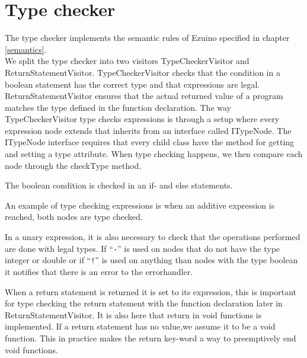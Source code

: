 \section{Type checker}
The type checker implements the semantic rules of Ezuino specified in chapter \ref{semantics}. \\
We split the type checker into two visitors TypeCheckerVisitor and ReturnStatementVisitor. TypeCheckerVisitor checks that the condition in a boolean statement has the correct type and that expressions are legal. ReturnStatementVisitor ensures that the actual returned value of a program matches the type defined in the function declaration.
The way TypeCheckerVisitor type checks expressions is through a setup where every expression node extends that inherits from an interface called ITypeNode. The ITypeNode interface requires that every child class have the method for getting and setting a type attribute. When type checking happens, we then compare each node through the checkType method.

\noindent\newline

The boolean condition is checked in an if- and else statements.

\noindent\newline

An example of type checking expressions is when an additive expression is reached, both nodes are type checked.

\noindent\newline

In a unary expression, it is also necessary to check that the operations performed are done with legal types. If “\texttt{-}” is used on nodes that do not have the type integer or double or if “\texttt{!}” is used on anything than nodes with the type boolean it notifies that there is an error to the errorhandler.

\noindent\newline

When a return statement is returned it is set to its expression, this is important for type checking the return statement with the function declaration later in ReturnStatementVisitor.
It is also here that return in void functions is implemented. If a return statement has no value,we assume it to be a void function. This in practice makes the return key-word a way to preemptively end void functions.

\noindent\newline

